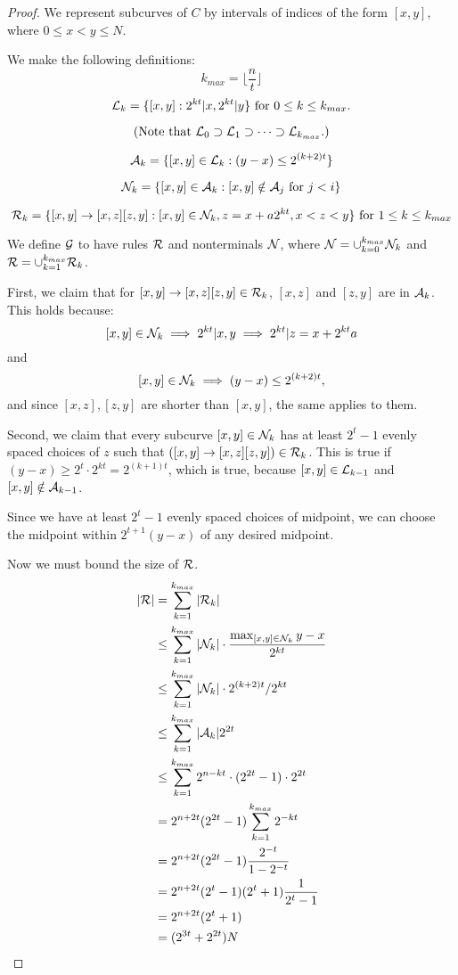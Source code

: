 \documentclass{article}
\begin{document}
\begin{proof}
We represent subcurves of $C$ by intervals of indices of the form
$[x,y]$, where $0\le x < y \le N$.

We make the following definitions:
$$k_{max} = \lfloor \frac{n}{t} \rfloor$$
$${\mathcal L}_k = \{ [x,y] : 2^{kt} | x, 2^{kt} | y \} \mbox{ for } 0 \le k \le k_{max}.$$ 

$$\mbox{(Note that } {\mathcal L}_0 \supset {\mathcal L}_1 \supset \cdots \supset {\mathcal L}_{k_{max}}.)$$

$${\mathcal A}_k = \{ [x,y] \in {\mathcal L}_k : (y-x) \le 2^{(k+2)t}\}$$

$${\mathcal N}_k = \{ [x,y] \in {\mathcal A}_k : [x,y] \notin {\mathcal A}_j \mbox{ for } j
< i \}$$

$${\mathcal R}_k = \{ [x,y] \to [x, z] [z, y] : [x,y] \in
{\mathcal N}_k, z = x + a2^{kt}, x < z < y \}\mbox{ for } 1\le k \le k_{max}$$

We define ${\mathcal G}$ to have rules ${\mathcal R}$ and nonterminals ${\mathcal N}$, where
${\mathcal N} = \cup_{k=0}^{k_{max}} {\mathcal N}_k$ and
 ${\mathcal R} = \cup_{k=1}^{k_{max}} {\mathcal R}_k$.

First, we claim that for $[x,y]\to [x,z][z,y]\in {\mathcal R}_k$, $[x,z]$ and
$[z,y]$ are in ${\mathcal A}_k$. This holds because:
$$[x,y]\in {\mathcal N}_k \implies 2^{kt} | x,y \implies 2^{kt} | z = x + 2^{kt}a$$
and
$$[x,y]\in {\mathcal N}_k \implies (y-x) \le 2^{(k+2)t},$$ and since $[x,z],
[z,y]$ are shorter than $[x,y]$, the same applies to them.

Second, we claim that every subcurve $[x,y]\in {\mathcal N}_k$ has at least
$2^t - 1$ evenly spaced choices of $z$ such that $([x,y] \to [x,z]
[z,y]) \in {\mathcal R}_k$. This is true if $(y-x) \ge 2^t \cdot 2^{kt} =
2^{(k+1)t}$, which is true, because $[x,y] \in {\mathcal L}_{k-1}$ and
$[x,y]\notin {\mathcal A}_{k-1}$.

Since we have at least $2^t - 1$ evenly spaced choices of midpoint, we
can choose the midpoint within $2^{t+1} (y-x)$ of any desired
midpoint.

Now we must bound the size of ${\mathcal R}$.
\begin{align*}
|{\mathcal R}| &= \sum_{k=1}^{k_{max}} |{\mathcal R}_k| \\
&\le \sum_{k=1}^{k_{max}} |{\mathcal N}_k| \cdot \frac{\max_{[x,y]\in{\mathcal N}_k} y-x }{2^{kt}}\\
&\le \sum_{k=1}^{k_{max}} |{\mathcal N}_k| \cdot 2^{(k+2)t} / 2^{kt}\\
&\le \sum_{k=1}^{k_{max}} |{\mathcal A}_k| 2^{2t}\\
&\le \sum_{k=1}^{k_{max}} 2^{n - kt} \cdot (2^{2t} - 1) \cdot 2^{2t}\\
&= 2^{n+2t}(2^{2t}-1) \sum_{k=1}^{k_{max}} 2^{-kt}\\
&= 2^{n+2t}(2^{2t}-1) \frac{2^{-t}}{1 - 2^{-t}}\\
&= 2^{n+2t}(2^{t}-1)(2^t + 1) \frac{1}{2^t - 1}\\
&= 2^{n+2t}(2^t + 1)\\
&= (2^{3t} + 2^{2t}) N
\end{align*}

\end{proof}
\end{document}
